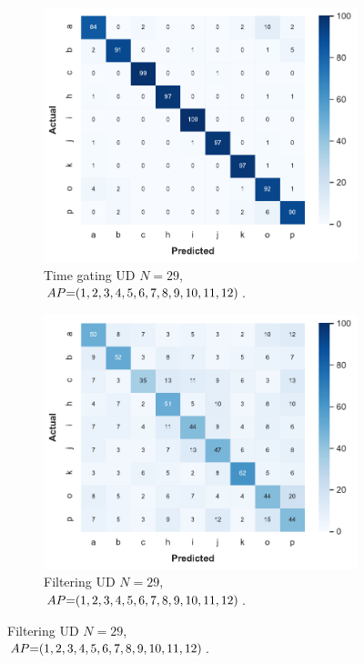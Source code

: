 \begin{figure}[!b]
    \begin{subfigure}{.49\textwidth}
        \centering
        \includegraphics[width=.99\linewidth]{Figures/RadarExperiments/Datasets/ThroughMaterials/Wood/confusion-timegating-ud.pdf}
        \vspace{-5pt}
        \captionsetup{width=.99\linewidth}
        \caption{Time gating UD $N{=}29$, \\ $\splitatcommas{AP{=}(1, 2, 3, 4, 5, 6, 7, 8, 9, 10, 11, 12)}$.}
        \label{fig:radar-experiments:through-materials:wood-confusion:timegating-ud}
    \end{subfigure}
    \begin{subfigure}{.49\textwidth}
        \centering
        \includegraphics[width=.99\linewidth]{Figures/RadarExperiments/Datasets/ThroughMaterials/Wood/confusion-filtering-ud.pdf}
        \vspace{-5pt}
        \captionsetup{width=.99\linewidth}
        \caption{Filtering UD $N{=}29$, \\ $\splitatcommas{AP{=}(1, 2, 3, 4, 5, 6, 7, 8, 9, 10, 11, 12)}$.}
        \label{fig:radar-experiments:through-materials:wood-confusion:filtering-ud}
    \end{subfigure}


\end{figure}

